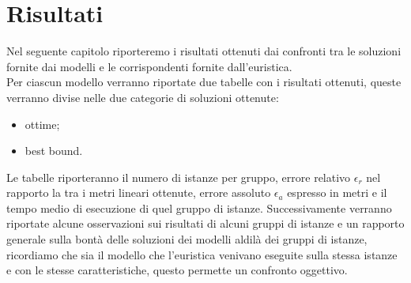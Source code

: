 
\hypertarget{(chap:capitolo7)}{}
\chapter{Risultati}
Nel seguente capitolo riporteremo i risultati ottenuti dai confronti tra le soluzioni fornite dai modelli e le corrispondenti fornite dall'euristica.\\
Per ciascun modello verranno riportate due tabelle con i risultati ottenuti, queste verranno divise nelle due categorie di soluzioni ottenute:
\begin{itemize}
	\item ottime;
	\item best bound.
\end{itemize} 
Le tabelle riporteranno il numero di istanze per gruppo, errore relativo $\epsilon_r$ nel rapporto la tra i metri lineari ottenute, errore assoluto $\epsilon_a$ espresso in metri e il tempo medio di esecuzione di quel gruppo di istanze. Successivamente verranno riportate alcune osservazioni sui risultati di alcuni gruppi di istanze e un rapporto generale sulla bontà delle soluzioni dei modelli aldilà dei gruppi di istanze, ricordiamo che sia il modello che l'euristica venivano eseguite sulla stessa istanze e con le stesse caratteristiche, questo permette un confronto oggettivo.

\newpage
